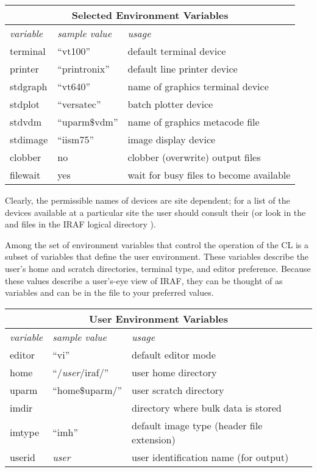 \begin{center}
\begin{tabular}{|l|l|l|}
\hline
\multicolumn{3}{|c|}{\bf Selected Environment Variables}\\
\hline
{\it variable}&  {\it sample value}&  {\it usage}\\
\hline
terminal&       ``vt100''&      default terminal device\\
printer&        ``printronix''& default line printer device\\
stdgraph&       ``vt640''&      name of graphics terminal device\\
stdplot&        ``versatec''&  	batch plotter device\\
stdvdm& 	``uparm\$vdm''&	name of graphics metacode file\\
stdimage&       ``iism75''&	image display device\\
clobber&        no&     	clobber (overwrite) output files\\
filewait&       yes&    	wait for busy files to become available\\
\hline
\end{tabular}
\end{center}
\medskip

\noindent
Clearly, the permissible names of devices are site dependent; for a list of
the devices available at a particular site the user should consult their
 (or look in the  and 
files in the IRAF logical directory ).

Among the set of environment variables that control the operation of
the CL is a subset of variables that define the user environment.  These
variables describe the user's home and scratch directories, terminal
type, and editor preference.  Because these values describe a user's-eye
view of IRAF, they can be thought of as  variables
and can be  in the  file to your 
preferred values.  

\begin{center}
\begin{tabular}{|l|l|l|}
\hline
\multicolumn{3}{|c|}{\bf User Environment Variables}\\
\hline
{\it variable}&  {\it sample value}&  {\it usage}\\
\hline
editor&		``vi'' &	default editor mode\\
home&		``/{\it user}/iraf/'' \footnotemark & user home directory\\
uparm&		``home\$uparm/''&	user scratch directory\\
imdir&  	\emphasize{system-dependent}&directory where bulk data is stored\\
imtype&  	``imh'' & default image type (header file extension)\\
userid&		{\it user}&	user identification name (for output)\\
\hline
\end{tabular}
\end{center}

